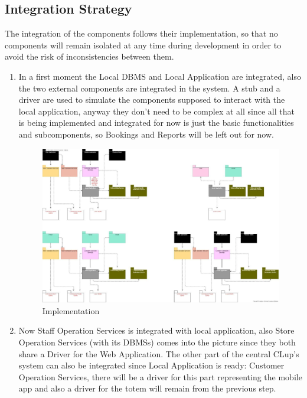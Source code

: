 \subsection{Integration Strategy}
The integration of the components follows their implementation, so that no components will remain isolated at any time during development in order to avoid the risk of inconsistencies between them.
\begin{enumerate}
	\item In a first moment the Local DBMS and Local Application are integrated, also the two external components are integrated in the system. A stub and a driver are used to simulate the components supposed to interact with the local application, anyway they don’t need to be complex at all since all that is being implemented and integrated for now is just the basic functionalities and subcomponents, so Bookings and Reports will be left out for now.
	\begin{figure}[H]
		\includegraphics[width=\linewidth]{../Diagrams/Implementation.png}
		\caption{Implementation}
		\label{fig:Implementation2}
	\end{figure}
	\item Now Staff Operation Services is integrated with local application, also Store Operation Services (with its DBMSs) comes into the picture since they both share a Driver for the Web Application. The other part of the central CLup’s system can also be integrated since Local Application is ready: Customer Operation Services, there will be a driver for this part representing the mobile app and also a driver for the totem will remain from the previous step.
	\begin{figure}[H]

\end{figure}
\end{enumerate}
